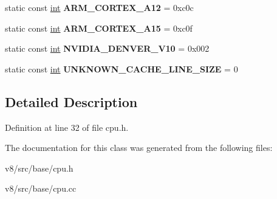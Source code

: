 \begin{DoxyCompactItemize}
\mbox{\label{classv8_1_1base_1_1CPU_a858cec98bb8f57c908b2799fe76d69da}} 
static const \mbox{\hyperlink{classint}{int}} {\bfseries A\+R\+M\+\_\+\+C\+O\+R\+T\+E\+X\+\_\+\+A12} = 0xc0c
\item 
\mbox{\label{classv8_1_1base_1_1CPU_a810b59326516f957777cbb630e5c3b63}} 
static const \mbox{\hyperlink{classint}{int}} {\bfseries A\+R\+M\+\_\+\+C\+O\+R\+T\+E\+X\+\_\+\+A15} = 0xc0f
\item 
\mbox{\label{classv8_1_1base_1_1CPU_a86999f884a737c2d18357f236f94f522}} 
static const \mbox{\hyperlink{classint}{int}} {\bfseries N\+V\+I\+D\+I\+A\+\_\+\+D\+E\+N\+V\+E\+R\+\_\+\+V10} = 0x002
\item 
\mbox{\label{classv8_1_1base_1_1CPU_a2ff081b104b72a6f54f4ce75d778f761}} 
static const \mbox{\hyperlink{classint}{int}} {\bfseries U\+N\+K\+N\+O\+W\+N\+\_\+\+C\+A\+C\+H\+E\+\_\+\+L\+I\+N\+E\+\_\+\+S\+I\+ZE} = 0
\end{DoxyCompactItemize}


\subsection{Detailed Description}


Definition at line 32 of file cpu.\+h.



The documentation for this class was generated from the following files\+:\begin{DoxyCompactItemize}
\item 
v8/src/base/cpu.\+h\item 
v8/src/base/cpu.\+cc\end{DoxyCompactItemize}
